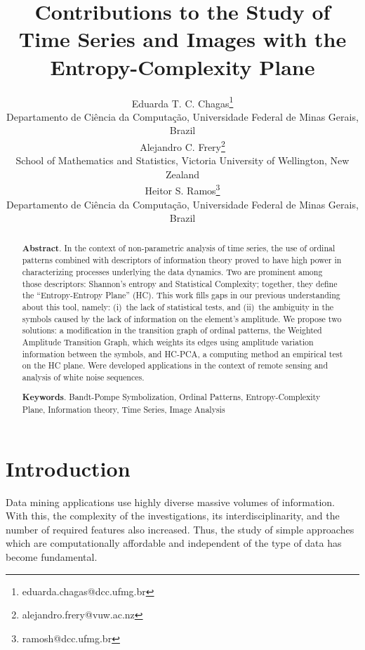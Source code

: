 \documentclass[a4,11pt]{pssbmac}
\begin{document}
\title{Contributions to the Study of Time Series and Images with the Entropy-Complexity Plane}

\author{
	{\large Eduarda T. C. Chagas}\thanks{eduarda.chagas@dcc.ufmg.br}\\
	{\small Departamento de Ci\^encia da Computa\c c\~ao, Universidade Federal de Minas Gerais, Brazil} \\
	{\large Alejandro C. Frery}\thanks{alejandro.frery@vuw.ac.nz} \\
	{\small School of Mathematics and Statistics, Victoria University of Wellington, New Zealand} \\
	{\large Heitor S. Ramos}\thanks{ramosh@dcc.ufmg.br} \\
	{\small Departamento de Ci\^encia da Computa\c c\~ao, Universidade Federal de Minas Gerais, Brazil} \\
}

\criartitulo

\begin{abstract}
	{\bf Abstract}. In the context of non-parametric analysis of time series, the use of ordinal patterns combined with descriptors of information theory proved to have high power in characterizing processes underlying the data dynamics.
	Two are prominent among those descriptors: Shannon's entropy and Statistical Complexity; together, they define the ``Entropy-Entropy Plane'' (HC). 
	This work fills gaps in our previous understanding about this tool, namely:
	(i)~the lack of statistical tests, and 
	(ii)~the ambiguity in the symbols caused by the lack of information on the element's amplitude.
	We propose two solutions: a modification in the transition graph of ordinal patterns, the Weighted Amplitude Transition Graph, which weights its edges using amplitude variation information between the symbols, and HC-PCA, a computing method an empirical test on the HC plane.
	Were developed applications in the context of remote sensing and analysis of white noise sequences. 
	
	\noindent
	{\bf Keywords}. Bandt-Pompe Symbolization, Ordinal Patterns, Entropy-Complexity Plane, Information theory, Time Series, Image Analysis
\end{abstract}

\section{Introduction}

Data mining applications use highly diverse massive volumes of information.
With this, the complexity of the investigations, its interdisciplinarity, and the number of required features also increased.
Thus, the study of simple approaches which are computationally affordable and independent of the type of data has become fundamental.
\end{document}

